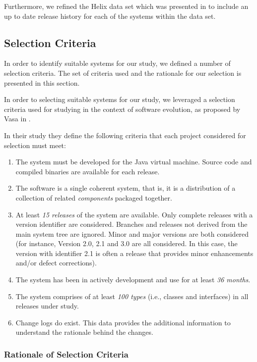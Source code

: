 Furthermore, we refined the Helix data set which was presented in \cite{Vasa10a} to include an up to date release history for each of the systems within the data set.


\subsection{Selection Criteria} %
\label{sub:selection_criteria}

In order to identify suitable systems for our study, we defined a number of selection criteria. The set of criteria used and the rationale for our selection is presented in this section.

In order to selecting suitable systems for our study, we leveraged a selection criteria used for studying \OSYS in the context of software evolution, as proposed by Vasa in \cite{Vasa10a}.

In their study they define the following criteria that each project considered for selection must meet:

\begin{enumerate}
	\item The system must be developed for the Java virtual machine. Source code and compiled binaries are available for each release.
	\item The software is a single coherent system, that is, it is a distribution of a collection of related {\em components} packaged together.
	\item At least {\em 15 releases} of the system are available. Only complete releases with a version identifier are considered. Branches and releases not derived from the main system tree are ignored.  Minor and major versions are both considered (for instance, Version 2.0, 2.1 and 3.0 are all considered. In this case, the version with identifier 2.1 is often a release that provides minor enhancements and/or defect corrections).
	\item The system has been in actively development and use for at least \emph{36 months}.
	\item The system comprises of at least \emph{100 types} (i.e., classes and interfaces) in all releases under study.
	\item Change logs do exist. This data provides the additional information to understand the rationale behind the changes.
\end{enumerate}

\subsubsection{Rationale of Selection Criteria} %
\label{ssub:rationale_of_selection_criteria}

